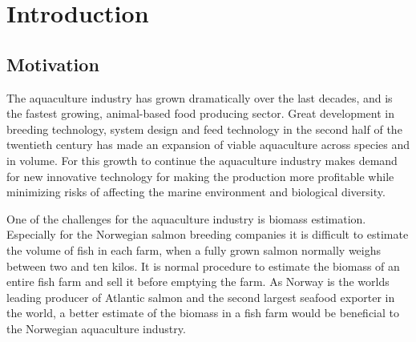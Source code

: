 \section{Introduction}\label{introduction}

\subsection{Motivation}\label{motivation}

The aquaculture industry has grown dramatically over the last decades, and is the fastest growing, animal-based food producing sector. 
Great development in breeding technology, system design and feed technology in the second half of the twentieth century has made an expansion of viable aquaculture across species and in volume.
For this growth to continue the aquaculture industry makes demand for new innovative technology for making the production more profitable while minimizing risks of affecting the marine environment and biological diversity.\cite{website:aquaculture}

One of the challenges for the aquaculture industry is biomass estimation. Especially for the Norwegian salmon breeding companies it is difficult to estimate the volume of fish in each farm, when a fully grown salmon normally weighs between two and ten kilos.\cite{website:biomass} It is normal procedure to estimate the biomass of an entire fish farm and sell it before emptying the farm. As Norway is the worlds leading producer of Atlantic salmon and the second largest seafood exporter in the world, a better estimate of the biomass in a fish farm would be beneficial to the Norwegian aquaculture industry.\cite{website:aquaculture}

